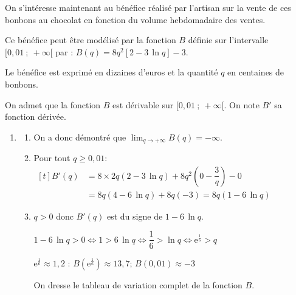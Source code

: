 \documentclass[10pt]{article}
\providecommand{\e}{{\mathrm{e}}}
\providecommand{\ds}{\displaystyle}
\begin{document}
On s'intéresse maintenant au bénéfice réalisé par l'artisan sur la vente de ces bonbons au chocolat en fonction du volume hebdomadaire des ventes.



Ce bénéfice peut être modélisé par la fonction $B$ définie sur l'intervalle $[0,01~;~+\infty[$ par :  $B(q) = 8q^2 [2 -3\,\ln q] - 3.$

Le bénéfice est exprimé en dizaines d'euros et la quantité $q$ en centaines de bonbons.

On admet que la fonction $B$ est dérivable sur $[0,01~;~+\infty[$. On note $B'$ sa fonction dérivée. 

\begin{enumerate}
\item 
	\begin{enumerate}
		\item
{}

On a donc démontré que $\ds\lim_{q \to +\infty} B(q)=-\infty$.

		\item Pour tout $q \geqslant 0,01$: 
$\begin{aligned}[t]
B'(q) 
& = 8\times 2q\left (2-3\,\ln q\right ) +8q^2\left (0 -\dfrac{3}{q}\right ) - 0\\
& = 8q\left (4 - 6\,\ln q\right ) + 8q\left (-3\right )
= 8q \left (1 - 6\,\ln q\right )
\end{aligned}$
		
		\item 
$q>0$ donc $B'(q)$ est du signe de $1- 6\,\ln q$.

$1- 6\,\ln q>0
\iff
1> 6\,\ln q
\iff
\dfrac{1}{6} > \ln q
\iff
\e^{\frac{1}{6}} > q$

$\e^{\frac{1}{6}} \approx 1,2$ : $B\left (\e^{\frac{1}{6}} \right ) \approx 13,7$;
$B(0,01) \approx -3$

On dresse le tableau de variation complet de la fonction $B$.


\end{enumerate}
\end{enumerate}
\end{document}
